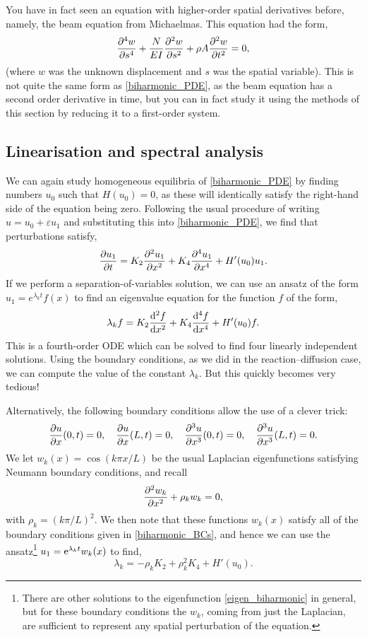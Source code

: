 \documentclass[main.tex]{subfiles}
\begin{document}
You have in fact seen an equation with higher-order spatial derivatives before, namely, the beam equation from Michaelmas. This equation had the form,
\begin{equation}
\pdn{4}{w}{s}+\frac{N}{EI}\pdd{w}{s}+\rho A\pdd{w}{t} = 0,
\end{equation}
(where $w$ was the unknown displacement and $s$ was the spatial variable). This is not quite the same form as \cref{biharmonic_PDE}, as the beam equation has a second order derivative in time, but you can in fact study it using the methods of this section by reducing it to a first-order system.

\subsection{Linearisation and spectral analysis}
We can again study homogeneous equilibria of \cref{biharmonic_PDE} by finding numbers $u_0$ such that $H(u_0)=0$, as these will identically satisfy the right-hand side of the equation being zero. Following the usual procedure of writing $u = u_0 + \varepsilon u_1$ and substituting this into \cref{biharmonic_PDE}, we find that perturbations satisfy,
\begin{equation}
    \pd{u_1}{t} = K_2\pdd{u_1}{x}+K_4\pdn{4}{u_1}{x} + H'(u_0)u_1.
\end{equation}
If we perform a separation-of-variables solution, we can use an ansatz of the form $u_1 = e^{\lambda_k t}f(x)$ to find an eigenvalue equation for the function $f$ of the form,
\begin{equation}\label{eigen_biharmonic}
\lambda_k f = K_2\fdd{f}{x}+K_4\fdn{4}{f}{x} + H'(u_0)f.
\end{equation}
This is a fourth-order ODE which can be solved to find four linearly independent solutions. Using the boundary conditions, as we did in the reaction--diffusion case, we can compute the value of the constant $\lambda_k$. But this quickly becomes very tedious!

Alternatively, the following boundary conditions allow the use of a clever trick:
\begin{equation}\label{biharmonic_BCs}
    \pd{u}{x}(0,t) = 0, \quad \pd{u}{x}(L,t) = 0, \quad \pdn{3}{u}{x}(0,t) = 0, \quad \pdn{3}{u}{x}(L,t) = 0.
\end{equation}
We let $w_k(x) = \cos(k \pi x/L)$ be the usual Laplacian eigenfunctions satisfying Neumann boundary conditions, and recall
\begin{equation}
    \pdd{w_k}{x} + \rho_k w_k = 0,
\end{equation}
with $\rho_k = (k\pi/L)^2$. We then note that these functions $w_k(x)$ satisfy all of the boundary conditions given in \cref{biharmonic_BCs}, and hence we can use the ansatz\footnote{There are other solutions to the eigenfunction \cref{eigen_biharmonic} in general, but for these boundary conditions the $w_k$, coming from just the Laplacian, are sufficient to represent any spatial perturbation of the equation.} $u_1 = \mathrm{e}^{\lambda_k t}w_k(x)$ to find,
\begin{equation}\label{biharmonic_growth_rates}
\lambda_k  = -\rho_kK_2+\rho_k^2K_4 + H'(u_0).
\end{equation}
\end{document}
